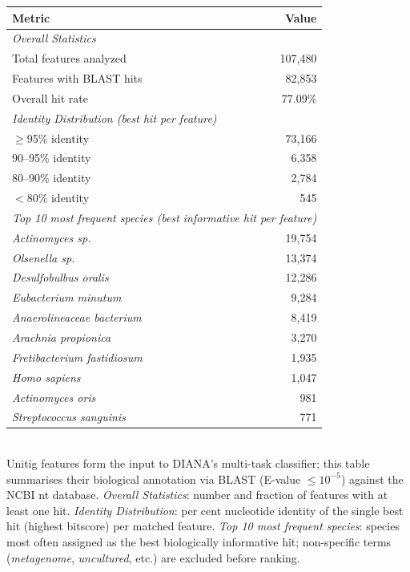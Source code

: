 \centering
\caption{BLAST annotation of DIANA's 107,480 unitig features against the NCBI nt database.}
\begin{tabular*}{\columnwidth}{@{\extracolsep{\fill}}lr}
\toprule
\textbf{Metric} & \textbf{Value} \\
\midrule
\multicolumn{2}{l}{\textit{Overall Statistics}} \\
Total features analyzed & 107,480 \\
Features with BLAST hits & 82,853 \\
Overall hit rate & 77.09\% \\
\midrule
\multicolumn{2}{l}{\textit{Identity Distribution (best hit per feature)}} \\
$\geq$95\% identity & 73,166 \\
90--95\% identity & 6,358 \\
80--90\% identity & 2,784 \\
$<$80\% identity & 545 \\
\midrule
\multicolumn{2}{l}{\textit{Top 10 most frequent species (best informative hit per feature)}} \\
\textit{Actinomyces sp.} & 19,754 \\
\textit{Olsenella sp.} & 13,374 \\
\textit{Desulfobulbus oralis} & 12,286 \\
\textit{Eubacterium minutum} & 9,284 \\
\textit{Anaerolineaceae bacterium} & 8,419 \\
\textit{Arachnia propionica} & 3,270 \\
\textit{Fretibacterium fastidiosum} & 1,935 \\
\textit{Homo sapiens} & 1,047 \\
\textit{Actinomyces oris} & 981 \\
\textit{Streptococcus sanguinis} & 771 \\
\bottomrule
\end{tabular*}\label{tab:blast_summary}
\\[2mm]
{\footnotesize Unitig features form the input to DIANA's multi-task classifier; this table summarises their biological annotation via BLAST (E-value $\leq 10^{-5}$) against the NCBI nt database. \textit{Overall Statistics}: number and fraction of features with at least one hit. \textit{Identity Distribution}: per cent nucleotide identity of the single best hit (highest bitscore) per matched feature. \textit{Top 10 most frequent species}: species most often assigned as the best biologically informative hit; non-specific terms (\textit{metagenome}, \textit{uncultured}, etc.) are excluded before ranking.}